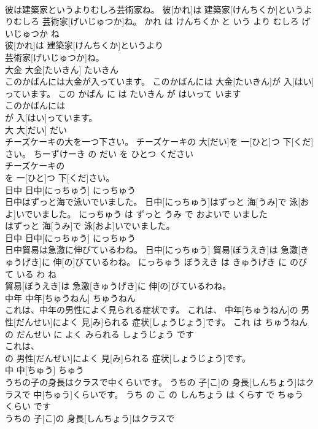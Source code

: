 \documentclass[8pt]{extreport}
\begin{document}
\begin{CJK}{UTF8}{min}
\\	彼は建築家というよりむしろ芸術家ね。	彼[かれ]は 建築家[けんちくか]というよりむしろ 芸術家[げいじゅつか]ね。	かれ は けんちくか と いう より むしろ げいじゅつか ね	
\\	彼[かれ]は 建築家[けんちくか]というより
\\	芸術家[げいじゅつか]ね。			
\\	大金	大金[たいきん]	たいきん	
\\	このかばんには大金が入っています。	このかばんには 大金[たいきん]が 入[はい]っています。	この かばん に は たいきん が はいって います	
\\	このかばんには
\\	が 入[はい]っています。			
\\	大	大[だい]	だい	
\\	チーズケーキの大を一つ下さい。	チーズケーキの 大[だい]を 一[ひと]つ 下[くだ]さい。	ちーずけーき の だい を ひとつ ください	
\\	チーズケーキの
\\	を 一[ひと]つ 下[くだ]さい。			
\\	日中	日中[にっちゅう]	にっちゅう	
\\	日中はずっと海で泳いでいました。	日中[にっちゅう]はずっと 海[うみ]で 泳[およ]いでいました。	にっちゅう は ずっと うみ で およいで いました	
\\	はずっと 海[うみ]で 泳[およ]いでいました。			
\\	日中	日中[にっちゅう]	にっちゅう	
\\	日中貿易は急激に伸びているわね。	日中[にっちゅう] 貿易[ぼうえき]は 急激[きゅうげき]に 伸[の]びているわね。	にっちゅう ぼうえき は きゅうげき に のびて いる わ ね	
\\	貿易[ぼうえき]は 急激[きゅうげき]に 伸[の]びているわね。			
\\	中年	中年[ちゅうねん]	ちゅうねん	
\\	これは、中年の男性によく見られる症状です。	これは、 中年[ちゅうねん]の 男性[だんせい]によく 見[み]られる 症状[しょうじょう]です。	これ は ちゅうねん の だんせい に よく みられる しょうじょう です	
\\	これは、
\\	の 男性[だんせい]によく 見[み]られる 症状[しょうじょう]です。			
\\	中	中[ちゅう]	ちゅう	
\\	うちの子の身長はクラスで中くらいです。	うちの 子[こ]の 身長[しんちょう]はクラスで 中[ちゅう]くらいです。	うち の こ の しんちょう は くらす で ちゅう くらい です	
\\	うちの 子[こ]の 身長[しんちょう]はクラスで

\end{CJK}
\end{document}
